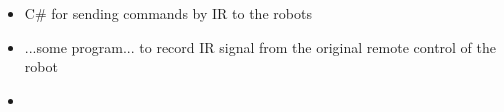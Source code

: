 \documentclass[documentation.tex]{subfiles}
\begin{document}
	\begin{itemize}
		\item C\# for sending commands by IR to the robots
		\item ...some program... to record IR signal from the original remote control of the robot
		\item 
	\end{itemize}
\end{document}
